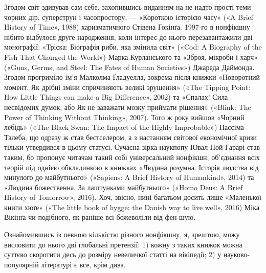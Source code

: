 Згодом світ здивував сам себе, захопившись виданням на не надто прості теми
чорних дір, суперструн і часопростору, — «Короткою історією часу» («A Brief
History of Time», 1988) харизматичного Стівена Гокінґа. 1997-го в нонфікшну
нібито відбулося друге народження, коли інтерес до нього перезавантажили дві
монографії: «Тріска: Біографія риби, яка змінила світ» («Cod: A Biography of
the Fish That Changed the World») Марка Курланського та «Зброя, мікроби і харч»
(«Guns, Germs, and Steel: The Fates of Human Societies») Джареда Даймонда.
Згодом прогриміло ім’я Малколма Ґладуелла, зокрема після книжки «Поворотний
момент. Як дрібні зміни спричиняють великі зрушення» («The Tipping Point: How
Little Things can make a Big Difference», 2002) та «Спалах! Сила несвідомих
думок, або Як не заважати мозку приймати рішення» («Blink: The Power of
Thinking Without Thinking», 2007). Того ж року вийшов «Чорний лебідь» («The
Black Swan: The Impact of the Highly Improbable») Нассіма Талеба, що одразу ж
став бестселером, а з настанням світової економічної кризи тільки утвердився в
цьому статусі. Сучасна зірка наукпопу Ювал Ной Гарарі став таким, бо пропонує
читачам такий собі універсальний нонфікшн, об’єднання всіх теорій під однією
обкладинкою в книжках «Людина розумна. Історія людства від минулого до
майбутнього» («Sapiens: A Brief History of Humankind», 2014) та «Людина
божественна. За лаштунками майбутнього» («Homo Deus: A Brief History of
Tomorrow», 2016). Хоч, звісно, нині багатьом досить лише «Маленької книги хюґе»
(«The little book of hygge: the Danish way to live well», 2016) Міка Вікінґа чи
подібного, як раніше всі божеволіли від фен-шую.

Ознайомившись із певною кількістю різного нонфікшну, я, зрештою, можу висловити
до нього дві глобальні претензії: 1) кожну з таких книжок можна суттєво
скоротити десь до розміру невеличкої статті на вікіпедії; 2) у
науково-популярній літературі є все, крім дива.

